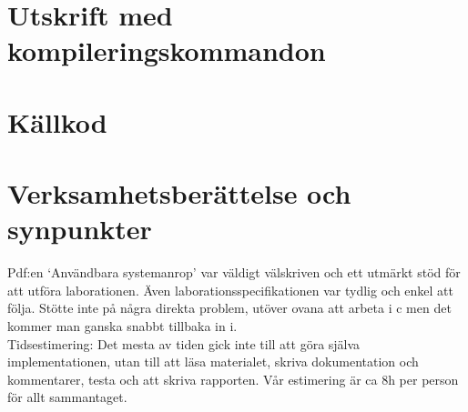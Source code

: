 \documentclass[a4paper]{article}
\begin{document}
\section*{Utskrift med kompileringskommandon}


\section*{Källkod}


\section*{Verksamhetsberättelse och synpunkter}
Pdf:en ‘Användbara systemanrop’ var väldigt välskriven och ett utmärkt stöd för att utföra laborationen. Även laborationsspecifikationen var tydlig och enkel att följa. Stötte inte på några direkta problem, utöver ovana att arbeta i c men det kommer man ganska snabbt tillbaka in i.
\\
Tidsestimering: Det mesta av tiden gick inte till att göra själva implementationen, utan till att läsa materialet, skriva dokumentation och kommentarer, testa och att skriva rapporten. Vår estimering är ca 8h per person för allt sammantaget.
\end{document}
